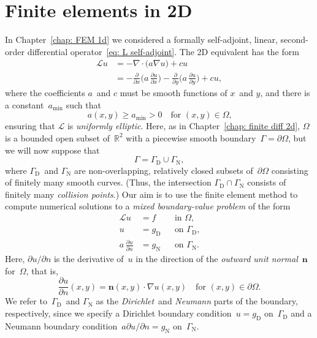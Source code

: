 \chapter{Finite elements in 2D}

In Chapter~\ref{chap: FEM 1d} we considered a formally self-adjoint, linear, 
second-order differential operator~\eqref{eq: L self-adjoint}.  The 2D 
equivalent has the form
\begin{equation}\label{eq: L self-adjoint 2d}
\begin{aligned}
\mathcal{L}u&=-\nabla\cdot\bigl(a\nabla u\bigr)+cu\\
	&=-\frac{\partial}{\partial x}\biggl(a\,\frac{\partial u}{\partial x}\biggr)
	-\frac{\partial}{\partial y}\biggl(a\,\frac{\partial u}{\partial y}\biggr)
	+cu,
\end{aligned}
\end{equation}
where the coefficients $a$~and $c$ must be smooth functions of $x$~and $y$, and 
there is a constant~$a_{\min}$ such that
\[
a(x,y)\ge a_{\min}>0\quad\text{for $(x,y)\in\Omega$,}
\]
ensuring that $\mathcal{L}$ is \emph{uniformly elliptic}.  Here, as in 
Chapter~\ref{chap: finite diff 2d}, $\Omega$ is a bounded open subset 
of~$\mathbb{R}^2$ with a piecewise smooth boundary~$\Gamma=\partial\Omega$, but 
we will now suppose that
\[
\Gamma=\Gamma_{\mathrm{D}}\cup\Gamma_{\mathrm{N}},
\]
where $\Gamma_{\mathrm{D}}$~and $\Gamma_{\mathrm{N}}$ are non-overlapping, 
relatively closed subsets of~$\partial\Omega$ consisting of finitely many 
smooth curves.  (Thus, the intersection 
$\Gamma_{\mathrm{D}}\cap\Gamma_{\mathrm{N}}$ consists of finitely many
\emph{collision points}.) Our aim is to use the finite element method to compute 
numerical solutions to a \emph{mixed boundary-value problem} of the form
\begin{equation}\label{eq: self-adjoint bvp 2d}
\begin{aligned}
\mathcal{L}u&=f&&\text{in~$\Omega$,}\\
u&=g_{\mathrm{D}}&&\text{on~$\Gamma_{\mathrm{D}}$,}\\
a\,\frac{\partial u}{\partial n}&=g_{\mathrm{N}}&&
	\text{on~$\Gamma_{\mathrm{N}}$.}
\end{aligned}
\end{equation}
Here, $\partial u/\partial n$ is the derivative of~$u$ in the direction of the 
\emph{outward unit normal}~$\boldsymbol{n}$ for~$\Omega$, that is,
\[
\frac{\partial u}{\partial n}(x,y)
	=\boldsymbol{n}(x,y)\cdot\nabla u(x,y)
	\quad\text{for $(x,y)\in\partial\Omega$.}
\]
We refer to~$\Gamma_{\mathrm{D}}$~and $\Gamma_{\mathrm{N}}$ as the 
\emph{Dirichlet}~and \emph{Neumann} parts of the boundary, respectively, since 
we specify a Dirichlet boundary condition~$u=g_{\mathrm{D}}$ 
on~$\Gamma_{\mathrm{D}}$ and a Neumann boundary 
condition~$a\partial u/\partial n=g_{\mathrm{N}}$ on~$\Gamma_{\mathrm{N}}$. 

